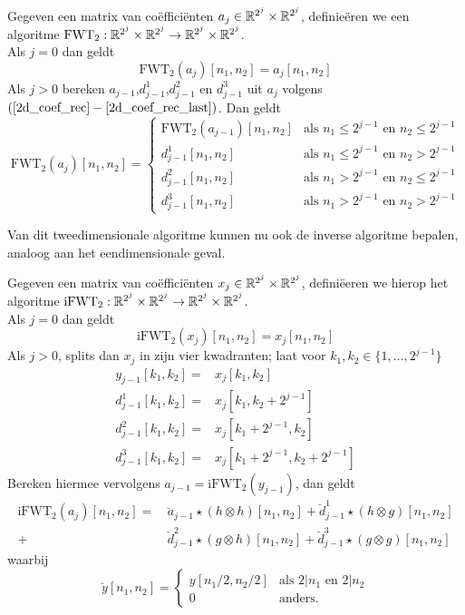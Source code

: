 \begin{algo}
  Gegeven een matrix van co\"effici\"enten $a_j\in\mathbb{R}^{2^j}\times\mathbb{R}^{2^j}$, definie\"eren
  we een algoritme \mbox{$\mathrm{FWT}_2:\mathbb{R}^{2^j}\times\mathbb{R}^{2^j}\to\mathbb{R}^{2^j}\times\mathbb{R}^{2^j}$}.\\
  Als $j=0$ dan geldt
  \[
  \mathrm{FWT}_2(a_j)[n_1,n_2] = a_j[n_1,n_2]
  \]
  Als $j>0$ bereken $a_{j-1}$,$d^1_{j-1}$,$d^2_{j-1}$ en $d^3_{j-1}$ uit $a_{j}$
  volgens $(\eqref{2d_coef_rec}-\eqref{2d_coef_rec_last})$.
  Dan geldt
  \begin{equation}
    \label{FWTd_def}
  \mathrm{FWT}_2(a_j)[n_1,n_2] = \begin{cases}
    \mathrm{FWT}_2(a_{j-1})[n_1,n_2] & \text{als } n_1 \leq 2^{j-1} \text{ en } n_2 \leq 2^{j-1}\\
    d^1_{j-1}[n_1,n_2]
    & \text{als } n_1\leq 2^{j-1} \text{ en } n_2>2^{j-1} \\
    d^2_{j-1}[n_1,n_2]
    & \text{als } n_1>2^{j-1} \text{ en } n_2\leq 2^{j-1} \\
    d^3_{j-1}[n_1,n_2] & \text{als } n_1>2^{j-1} \text{ en } n_2>2^{j-1} \end{cases}
  \end{equation}
\end{algo}
Van dit tweedimensionale algoritme kunnen nu ook de inverse algoritme bepalen, analoog aan het eendimensionale geval.
\begin{algo}
  Gegeven een matrix van  co\"effici\"enten $x_j\in\mathbb{R}^{2^j}\times\mathbb{R}^{2^j}$, defini\"eeren we hierop het
  algoritme \mbox{$\mathrm{iFWT}_2:\mathbb{R}^{2^j}\times\mathbb{R}^{2^j}\to\mathbb{R}^{2^j}\times\mathbb{R}^{2^j}$}.\\
  Als $j=0$ dan geldt
  \[
  \mathrm{iFWT}_2(x_j)[n_1,n_2] = x_j[n_1,n_2]
  \]
  Als $j>0$, splits dan $x_j$ in zijn vier kwadranten; laat voor $k_1,k_2\in \{1,\ldots,2^{j-1}\}$
  \begin{eqnarray*}
    y_{j-1}[k_1,k_2]   =& x_j[k_1,k_2] \\
    d^1_{j-1}[k_1,k_2] =& x_j[k_1,k_2+2^{j-1}] \\
    d^2_{j-1}[k_1,k_2] =& x_j[k_1+2^{j-1},k_2] \\
    d^3_{j-1}[k_1,k_2] =& x_j[k_1+2^{j-1},k_2+2^{j-1}]
  \end{eqnarray*}
  Bereken hiermee vervolgens $a_{j-1} = \mathrm{iFWT}_2(y_{j-1})$,
  dan geldt
  \begin{equation}
    \label{iFWTd_def}
    \begin{split}
      \mathrm{iFWT}_2(a_j)[n_1,n_2] =&\, \breve{a}_{j-1} \star (h \otimes h)[n_1,n_2] 
      + \breve{d}_{j-1}^1 \star (h \otimes g)[n_1,n_2] \\
      +&\, \breve{d}_{j-1}^2 \star (g \otimes h)[n_1,n_2] 
      + \breve{d}_{j-1}^3 \star (g \otimes g)[n_1,n_2]
    \end{split}
  \end{equation}
  waarbij 
  \[
  \breve y [n_1,n_2] = \begin{cases} 
    y[n_1/2,n_2/2] & \text{als } 2|n_1 \text{ en } 2|n_2 \\ 
    0 &\text{anders.}\end{cases}
  \]
\end{algo}
